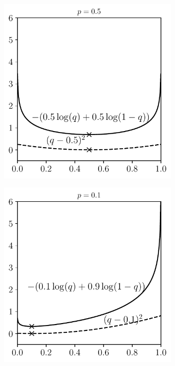 \begin{figure}[t]
    \begin{subfigure}{0.325\textwidth}
    \includegraphics[width=0.99\linewidth]{Chapters/05_NeuralNetworks/13_softmax/crossentropy1.pdf}
    \caption{}
    \end{subfigure}
    \begin{subfigure}{0.325\textwidth}
    \includegraphics[width=0.99\linewidth]{Chapters/05_NeuralNetworks/13_softmax/crossentropy2.pdf}

\end{subfigure}
\end{figure}
